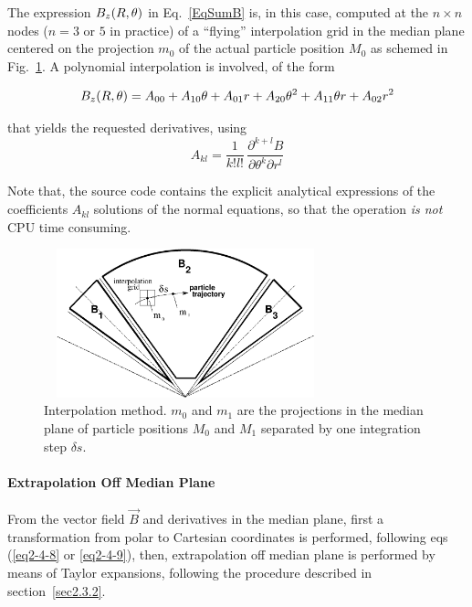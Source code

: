 \bigskip


\bigskip

\noindent The expression ${B_z}(R,\theta)$ in Eq.~\ref{EqSumB} is, in this case, 
computed at  the $n\times n$ nodes  ($n=3$ or $5$ in practice)  
of a ``flying'' interpolation grid in the median plane centered on the projection $m_0$ of 
the actual particle position $M_0$ as schemed 
in Fig.~\ref{FigGrid}. A polynomial interpolation is involved, of the form 

$${B_z}(R,\theta) = A_{00} + A_{10}\theta + A_{01}r + A_{20}\theta^2 + A_{11}\theta r + A_{02}r^2 $$

\noindent  that yields the requested   derivatives, using 
$$	A_{kl} = \frac{1 }{ k!l!}\,  \frac{\partial^{ k+l}B }{ \partial \theta^k\partial r^l} $$

\noindent Note that, the source code contains the explicit analytical 
expressions of the coefficients $A_{kl}$ solutions of the normal 
equations, so that the operation {\it is not}   CPU time consuming. 

\begin{figure}[h]
 \begin{center}
\includegraphics*[bbllx=30,bblly=150,bburx=590,bbury=400,width=8.2cm,height=4.3cm]{grid.eps}
  \caption{ \small     \label{FigGrid}
Interpolation method.  
$m_0$ and $m_1$ are the projections in the median plane of particle positions $M_0$ and $M_1$  separated 
by one integration step $\delta s$. 
}
  \end{center}
\end{figure}


\bigskip

\paragraph{Extrapolation Off Median Plane} 

\noindent From the vector field $ \vec  B $ and  derivatives in the median plane, 
first a transformation from polar to Cartesian coordinates is 
performed, following eqs (\ref{eq2-4-8} or \ref{eq2-4-9}), then,  extrapolation off median plane is 
performed by means of Taylor expansions, following the procedure described in section~\ref{sec2.3.2}. 




